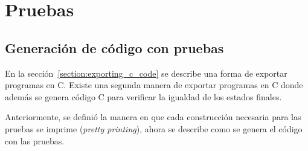 \begin{comment}
\begin{lstlisting}[mathescape=true, frame=single]
definition
  emit_globals_tests ::
    "vname list $\Rightarrow$ state $\rightharpoonup$ (nat set $\times$ test_instr list)"
where "emit_globals_tests $\equiv$ $\lambda$vnames ($\sigma$,$\gamma$,$\mu$).
  fold_option ($\lambda$x (D,emit). do {
    case $\gamma$ x of
      Some vo $\Rightarrow$ do {
        let cai = x;
        case vo of
            None $\Rightarrow$ Some (D,emit)
          | Some (I v) $\Rightarrow$ Some (D,emit @ [Assert_Eq cai v])
          | Some (NullVal) $\Rightarrow$ Some (D,emit @ [Assert_Eq_Null cai] )
          | Some (A addr) $\Rightarrow$ do {
              (D,emit $\leftarrow$ dfs $\mu$ D addr cai;
              Some (D,emit@emit')
            }
      }
    | _ $\Rightarrow$ Some (D,emit)
  }
  ) vnames ({},[])"
\end{lstlisting}
\end{comment}


\section{Pruebas}

\subsection{Generación de código con pruebas}\label{subsection:codegen_with_tests}

En la sección~\ref{section:exporting_c_code} se describe una forma de exportar programas en C.
Existe una segunda manera de exportar programas en C donde además se genera código C para verificar la igualdad de los estados finales.

Anteriormente, se definió la manera en que cada construcción necesaria para las pruebas se imprime (\textit{pretty printing}), ahora se describe como se genera el código con las pruebas.

